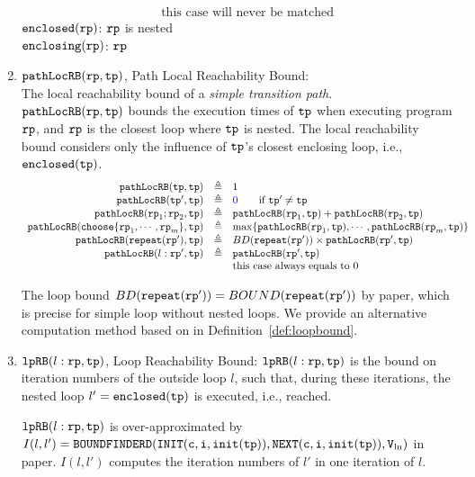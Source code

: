 \begin{enumerate}
\[\begin{array}{rcl}
        &  & \text{this case will never be matched}
        \end{array}
      \]
      $\mathtt{enclosed}(\mathtt{rp})$:  $\mathtt{rp}$ is nested
      \\
      $\mathtt{enclosing}(\mathtt{rp})$:  $\mathtt{rp}$
%
\item $\mathtt{pathLocRB}(\mathtt{rp}, \mathtt{tp})$, Path Local Reachability Bound:
\\
The local reachability bound of a \emph{simple transition path}. 
\\
$\mathtt{pathLocRB}(\mathtt{rp}, \mathtt{tp})$ bounds the execution times of $\mathtt{tp}$ when executing program $\mathtt{rp}$,
and $\mathtt{rp}$ is the closest loop where $\mathtt{tp}$ is nested.
The local reachability bound  considers only the influence of $\mathtt{tp}$'s closest enclosing loop, i.e., $\mathtt{enclosed}(\mathtt{tp})$.
%
\[
  \begin{array}{rcl}
    \outinB(\tpath, \tpath) & \triangleq & 1 \\
    \outinB(\tpath', \tpath) & \triangleq & \highlight{0} \qquad \text{if } \tpath' \neq \tpath\\
    \outinB(\rprog_1;\rprog_2, \tpath) & \triangleq & \outinB(\rprog_1, \tpath) + \outinB(\rprog_2, \tpath) \\
    \outinB(\rpchoose{\rprog_1, \cdots, \rprog_m }, \tpath) & \triangleq 
    & \max\left\{ \outinB(\rprog_1, \tpath), \cdots, \outinB(\rprog_m, \tpath) \right\} \\
    \outinB(\rprepeat(\rprog'), \tpath) & \triangleq 
    & BD(\rprepeat(\rprog'))
     \times \outinB(\rprog', \tpath)
     \\
    \outinB(l: \rprog', \tpath) & \triangleq & \outinB(\rprog', \tpath) \\
    &  & \text{this case always equals to } 0 \\
  \end{array}
  \]

  The loop bound $BD(\mathtt{repeat}(\mathtt{rp}')) = BOUND(\mathtt{repeat}(\mathtt{rp}'))$ by paper\cite{GulwaniJK09}, which is precise for simple loop without nested loops. 
  We provide an alternative computation method based on \cite{sinn2017complexity} in Definition~\ref{def:loopbound}.
      \item $\mathtt{lpRB}(l: \mathtt{rp}, \mathtt{tp})$,
      {Loop Reachability Bound}:
        $\mathtt{lpRB}(l: \mathtt{rp}, \mathtt{tp})$
        is the bound on iteration numbers of the outside loop $l$,
        such that,
        during these iterations, the nested loop $l' = \mathtt{enclosed(\mathtt{tp})}$ is executed, i.e., reached.
        
        $\mathtt{lpRB}(l:\mathtt{rp}, \mathtt{tp})$ is over-approximated by
        $I(l, l') = \mathtt{BOUNDFINDERD(INIT(c, i, \mathtt{init}(\mathtt{tp})), NEXT(c, i, \mathtt{init}(\mathtt{tp})), V_{\ln})}$ in paper\cite{GulwaniJK09}.
        $I(l, l')$ computes the iteration numbers of $l'$ in one iteration of $l$.
\end{enumerate}
